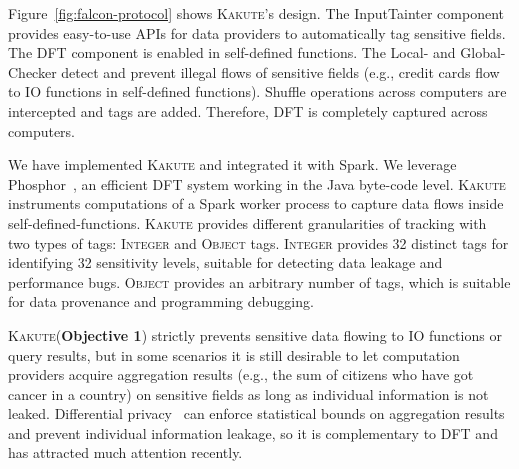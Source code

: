 \documentclass{article}
\newcommand{\kakute}[0]{\textsc{Kakute}\xspace}
\newcommand{\func}[1]{\textsc{#1}}
\newcommand{\appsn}[0]{4\space}
\newcommand{\eg}{{e.g.}}
\begin{document}
Figure~\ref{fig:falcon-protocol} shows \kakute's design. The 
InputTainter component provides easy-to-use APIs for data providers to 
automatically tag sensitive fields. The DFT component is enabled in 
self-defined functions. The Local- and Global-Checker detect and 
prevent illegal flows of sensitive fields (\eg, credit cards flow to IO 
functions in self-defined functions). Shuffle operations across computers are 
intercepted and tags are added. Therefore, DFT is completely captured across 
computers.

We have implemented \kakute and integrated it with Spark. We leverage 
Phosphor~\cite{oo14:phosphor}, an efficient DFT system working in the Java 
byte-code level. \kakute instruments computations of a Spark worker process
to capture data flows inside self-defined-functions. \kakute provides different 
granularities of tracking with two types of tags: \func{Integer}
and \func{Object} tags. \func{Integer} provides 32 distinct tags for 
identifying 32 sensitivity levels, suitable for detecting data leakage and 
performance bugs. \func{Object} provides an arbitrary number of tags, which is 
suitable for data provenance and programming debugging.

\kakute (\textbf{Objective 1}) strictly prevents
sensitive data flowing to IO functions or query results, but in some scenarios 
it is still desirable to let computation providers acquire aggregation 
results (\eg, the sum of citizens who have got cancer in a country) 
on sensitive fields as long as individual information is not leaked. 
Differential privacy~\cite{Dwork2006Differential} can enforce statistical 
bounds on 
aggregation results and prevent individual information leakage, so it is 
complementary to DFT and has attracted much attention recently.

\end{document}
